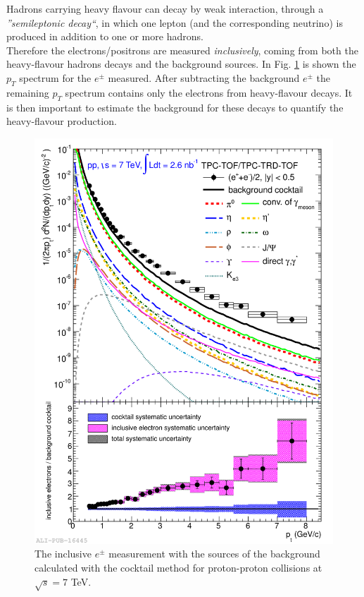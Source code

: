 \documentclass[a4paper,twocolumn,gsifonts,twoside]{gsipaper}
\begin{document}
Hadrons carrying heavy flavour can decay by weak interaction, through a \textit{''semileptonic decay``}, in which one lepton (and the 
corresponding neutrino) is produced in addition to one or more hadrons.\\
Therefore the electrons/positrons are measured \textit{inclusively}, coming from both the heavy-flavour hadrons decays and the 
background sources. In Fig. \ref{cocktail} \space is shown the $p_{T}$ spectrum for the $e^{\pm}$ measured. 
After subtracting the background $e^{\pm}$ the remaining $p_{T}$ spectrum contains only the electrons from heavy-flavour decays.
It is then important to estimate the background for these decays to quantify the heavy-flavour production. \\

\begin{figure}[tb]
\begin{center}
\includegraphics[scale = 0.12]{2013-Jan-03-inclusive_versus_cocktail_combined_mult.png}
\caption{The inclusive $e^{\pm}$ measurement with the sources of the background calculated with the cocktail method 
\cite{Averbeck:2013oga} for proton-proton collisions at $\sqrt{s} = 7$ TeV.}
\label{cocktail}
\end{center}
\end{figure}
\end{document}
